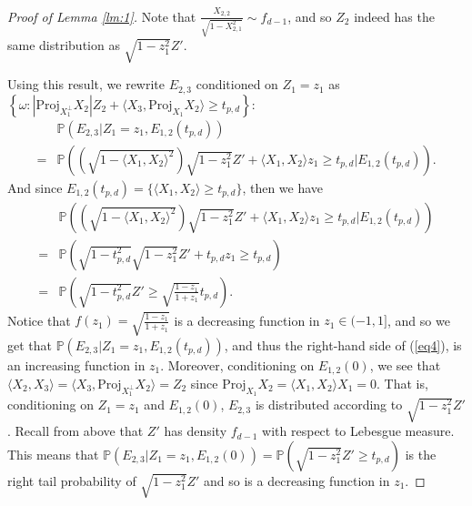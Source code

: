 \documentclass{article}
\begin{document}
\begin{proof}[Proof of Lemma \ref{lm:1}]
Note that $\frac{X_{2,2}}{\sqrt{1 - X_{2,1}^2}} \sim f_{d-1}$, and so $Z_2$ indeed has the same distribution as $\sqrt{1 - z_1^2}Z'$.

Using this result, we rewrite $E_{2,3}$ conditioned on $Z_1 = z_1$ as $\left\{ \omega: \left|\text{Proj}_{X_1^{\perp}}X_2 \right| Z_2 + \langle X_3, \text{Proj}_{X_1}X_2 \rangle \geq t_{p,d} \right\}$:
\begin{align*}
    &\mathbb{P}(E_{2,3} | Z_1 = z_1, E_{1,2}(t_{p,d}))\\
    =&\mathbb{P} \left( \left(\sqrt{1 - \langle X_1, X_2 \rangle^2} \right)\sqrt{1 - z_1^2}Z' +  \langle X_1, X_2 \rangle z_1 \geq t_{p,d}  | E_{1,2}(t_{p,d}) \right).
\end{align*}
And since $E_{1,2}(t_{p,d}) = \{ \langle X_1, X_2 \rangle \geq t_{p, d} \}$, then we have 
\begin{align}
    &\mathbb{P} \left( \left(\sqrt{1 - \langle X_1, X_2 \rangle^2} \right)\sqrt{1 - z_1^2}Z' +  \langle X_1, X_2 \rangle z_1 \geq t_{p,d}  | E_{1,2}(t_{p,d}) \right) \nonumber\\
    =&\mathbb{P} \left( \sqrt{1 - t_{p,d}^2} \sqrt{1 - z_1^2}Z' +   t_{p,d}z_1 \geq t_{p,d} \right) \nonumber\\
    =&\mathbb{P} \left( \sqrt{1 - t_{p,d}^2} Z' \geq \sqrt{\frac{1-z_1}{1+z_1}} t_{p,d} \right)\label{eq6}.
\end{align}
Notice that $f(z_1) = \sqrt{\frac{1-z_1}{1+z_1}}$ is a decreasing function in $z_1 \in (-1, 1]$, and so we get that $\mathbb{P}(E_{2,3} | Z_1 = z_1, E_{1,2}(t_{p,d}))$, and thus the right-hand side of (\ref{eq4}), is an increasing function in $z_1$. Moreover, conditioning on $E_{1,2}(0)$, we see that $\langle X_2, X_3 \rangle = \langle X_3, \text{Proj}_{X_1^{\perp}}X_2 \rangle = Z_2$ since $\text{Proj}_{X_1}X_2 = \langle X_1, X_2 \rangle X_1 = 0$. That is, conditioning on $Z_1 = z_1$ and $E_{1,2}(0)$, $E_{2,3}$ is distributed according to $\sqrt{1 - z_1^2}Z'$. Recall from above that $Z'$ has density $f_{d-1}$ with respect to Lebesgue measure. This means that $\mathbb{P} (E_{2,3} | Z_1 = z_1, E_{1,2}(0)) = \mathbb{P}(\sqrt{1 - z_1^2}Z' \geq t_{p,d})$ is the right tail probability of $\sqrt{1 - z_1^2}Z'$ and so is a decreasing function in $z_1$.


\end{proof}
\end{document}
